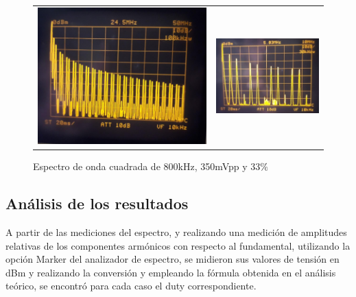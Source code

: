 \begin{figure}[H]
    \centering
    \begin{tabular}{c c}
        \includegraphics[scale=0.16]{../Mediciones/Ejercicio_2/ej2_cuadrada_33.jpeg} &
        \includegraphics[scale=0.5]{../Mediciones/Ejercicio_2/ej2_cuadrada_33_zoom.jpeg}
    \end{tabular}
    \caption{Espectro de onda cuadrada de 800kHz, 350mVpp y 33$\%$}
    \label{ej2_cuadrada_33}
\end{figure}

\subsection{An\'alisis de los resultados}
A partir de las mediciones del espectro, y realizando una medici\'on de amplitudes relativas de los componentes arm\'onicos con respecto al fundamental,
utilizando la opci\'on Marker del analizador de espectro, se midieron sus valores de tensi\'on en dBm y realizando la conversi\'on y empleando la f\'ormula
obtenida en el an\'alisis te\'orico, se encontr\'o para cada caso el duty correspondiente.


